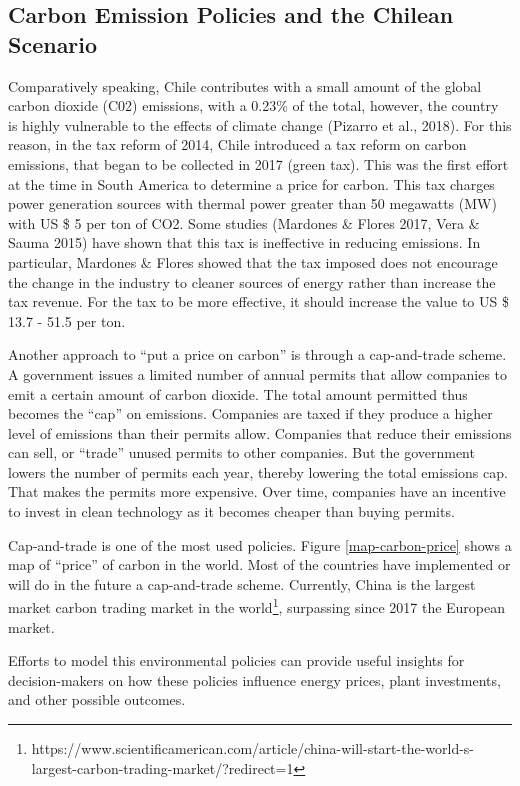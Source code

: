 \documentclass[11pt, letterpaper]{article}
\begin{document}
\subsection{Carbon Emission Policies and the Chilean Scenario}

Comparatively speaking, Chile contributes with a small amount of the global carbon dioxide (C02) emissions, with a 0.23\% of the total, however, the country is highly vulnerable to the effects of climate change (Pizarro et al., 2018). For this reason, in the tax reform of 2014, Chile introduced a tax reform on carbon emissions, that began to be collected in 2017 (green tax). This was the first effort at the time in South America to determine a price for carbon.  This tax charges power generation sources with thermal power greater than 50 megawatts (MW) with US \$ 5 per ton of CO2. Some studies (Mardones \& Flores 2017, Vera \& Sauma 2015) have shown that this tax is ineffective in reducing emissions. In particular, Mardones \& Flores showed that the tax imposed does not encourage the change in the industry to cleaner sources of energy rather than increase the tax revenue. For the tax to be more effective, it should increase the value to US \$ 13.7 - 51.5 per ton.
\smallskip

Another approach to ``put a price on carbon'' is through a cap-and-trade scheme.  A government issues a limited number of annual permits that allow companies to emit a certain amount of carbon dioxide. The total amount permitted thus becomes the ``cap'' on emissions. Companies are taxed if they produce a higher level of emissions than their permits allow. Companies that reduce their emissions can sell, or ``trade'' unused permits to other companies. But the government lowers the number of permits each year, thereby lowering the total emissions cap. That makes the permits more expensive. Over time, companies have an incentive to invest in clean technology as it becomes cheaper than buying permits.

Cap-and-trade is one of the most used policies. Figure \ref{map-carbon-price} shows a map of ``price'' of carbon in the world. Most of the countries have implemented or will do in the future a cap-and-trade scheme. Currently, China is the largest market carbon trading market in the world\footnote{https://www.scientificamerican.com/article/china-will-start-the-world-s-largest-carbon-trading-market/?redirect=1}, surpassing since 2017 the European market.

\smallskip

Efforts to model this environmental policies can provide useful insights for decision-makers on how these policies influence energy prices, plant investments, and other possible outcomes. 
\end{document}
